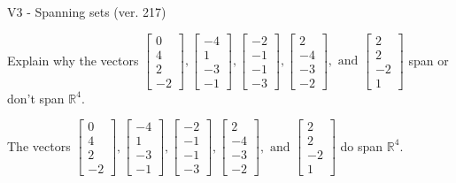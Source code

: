 \begin{exercise}
  \begin{exerciseTitle}V3 - Spanning sets (ver. 217)\end{exerciseTitle}
  \begin{exerciseStatement}
    Explain why the vectors \(\left[\begin{array}{r}
0 \\
4 \\
2 \\
-2
\end{array}\right] , \left[\begin{array}{r}
-4 \\
1 \\
-3 \\
-1
\end{array}\right] , \left[\begin{array}{r}
-2 \\
-1 \\
-1 \\
-3
\end{array}\right] , \left[\begin{array}{r}
2 \\
-4 \\
-3 \\
-2
\end{array}\right] , \text{ and } \left[\begin{array}{r}
2 \\
2 \\
-2 \\
1
\end{array}\right]\) span or don't span \(\mathbb{R}^4\). 
	


  \end{exerciseStatement}
  \begin{exerciseAnswer}
   The vectors \(\left[\begin{array}{r}
0 \\
4 \\
2 \\
-2
\end{array}\right] , \left[\begin{array}{r}
-4 \\
1 \\
-3 \\
-1
\end{array}\right] , \left[\begin{array}{r}
-2 \\
-1 \\
-1 \\
-3
\end{array}\right] , \left[\begin{array}{r}
2 \\
-4 \\
-3 \\
-2
\end{array}\right] , \text{ and } \left[\begin{array}{r}
2 \\
2 \\
-2 \\
1
\end{array}\right]\) 
  	 do  
	span \(\mathbb{R}^4\).
  



\end{exerciseAnswer}
\end{exercise}
